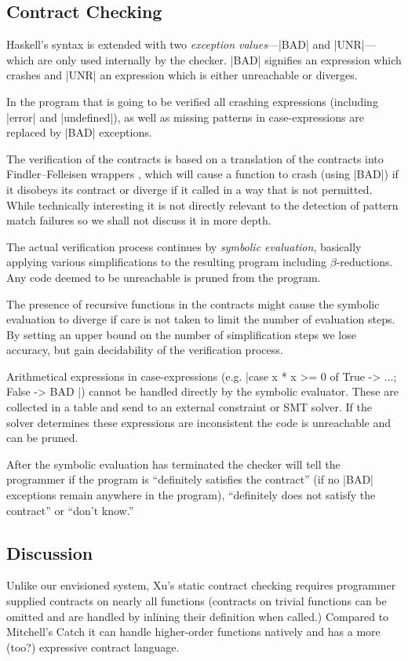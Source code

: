 \subsection{Contract Checking}
Haskell's syntax is extended with two \emph{exception values}---|BAD| and |UNR|---which are only used internally by the checker. |BAD| signifies an expression which crashes and |UNR| an expression which is either unreachable or diverges.

In the program that is going to be verified all crashing expressions (including |error| and |undefined|), as well as missing patterns in case-expressions are replaced by |BAD| exceptions.

The verification of the contracts is based on a translation of the contracts into Findler--Felleisen wrappers \cite{Findler:2002:CHF:581478.581484}, which will cause a function to crash (using |BAD|) if it disobeys its contract or diverge if it called in a way that is not permitted. While technically interesting it is not directly relevant to the detection of pattern match failures so we shall not discuss it in more depth.

The actual verification process continues by \emph{symbolic evaluation}, basically applying various simplifications to the resulting program including $\beta$-reductions. Any code deemed to be unreachable is pruned from the program.

The presence of recursive functions in the contracts might cause the symbolic evaluation to diverge if care is not taken to limit the number of evaluation steps. By setting an upper bound on the number of simplification steps we lose accuracy, but gain decidability of the verification process.

Arithmetical expressions in case-expressions (e.g. |case x * x >= 0 of { True -> ...; False -> BAD }|) cannot be handled directly by the symbolic evaluator. These are collected in a table and send to an external constraint or SMT solver. If the solver determines these expressions are inconsistent the code is unreachable and can be pruned.

After the symbolic evaluation has terminated the checker will tell the programmer if the program is ``definitely satisfies the contract'' (if no |BAD| exceptions remain anywhere in the program), ``definitely does not satisfy the contract'' or ``don't know.''

\subsection{Discussion}
Unlike our envisioned system, Xu's static contract checking requires programmer supplied contracts on nearly all functions (contracts on trivial functions can be omitted and are handled by inlining their definition when called.) Compared to Mitchell's Catch it can handle higher-order functions natively and has a more (too?) expressive contract language.

